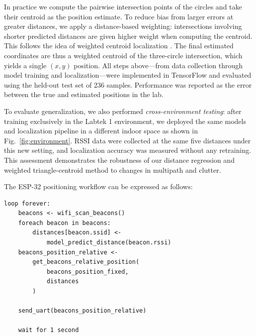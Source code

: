 In practice we compute the pairwise intersection points of the circles and take their centroid as the position estimate. To reduce bias from larger errors at greater distances, we apply a distance-based weighting: intersections involving shorter predicted distances are given higher weight when computing the centroid. This follows the idea of weighted centroid localization \cite{nagah2021enhanced}. The final estimated coordinates are thus a weighted centroid of the three-circle intersection, which yields a single $(x,y)$ position. All steps above—from data collection through model training and localization—were implemented in TensorFlow and evaluated using the held-out test set of 236 samples. Performance was reported as the error between the true and estimated positions in the lab.

To evaluate generalization, we also performed \emph{cross-environment testing}: after training exclusively in the Labtek 1 environment, we deployed the same models and localization pipeline in a different indoor space as shown in Fig.~\ref{fig:environment}. RSSI data were collected at the same five distances under this new setting, and localization accuracy was measured without any retraining. This assessment demonstrates the robustness of our distance regression and weighted triangle-centroid method to changes in multipath and clutter.

The ESP-32 positioning workflow can be expressed as follows:
\begin{lstlisting}
loop forever:
    beacons <- wifi_scan_beacons()
    foreach beacon in beacons:
        distances[beacon.ssid] <-
            model_predict_distance(beacon.rssi)
    beacons_position_relative <-
        get_beacons_relative_position(
            beacons_position_fixed,
            distances
        )

    send_uart(beacons_position_relative)
		
    wait for 1 second
\end{lstlisting}